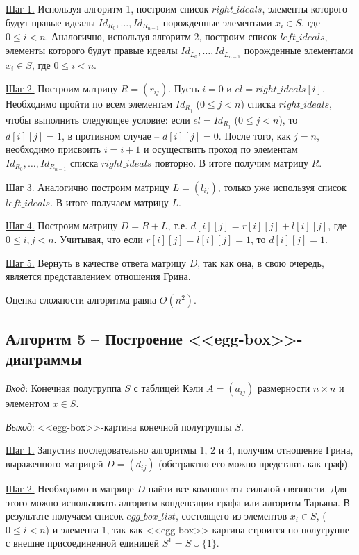 \documentclass[spec, och, labwork]{shiza}
\begin{document}
      \underline{Шаг 1.} Используя алгоритм 1, построим список $right\_ideals$, элементы которого будут правые идеалы $Id_{R_0}, \dots, Id_{R_{n-1}}$ порожденные
      элементами $x_i \in S$, где $0 \leq i < n$. Аналогично, используя алгоритм 2, построим список $left\_ideals$, элементы которого будут правые идеалы
      $Id_{L_0}, \dots, Id_{L_{n-1}}$ порожденные элементами $x_i \in S$, где $0 \leq i < n$.
      
      \underline{Шаг 2.}  Построим матрицу $R = (r_{ij})$. Пусть $i = 0$ и $el = right\_ideals[i]$. Необходимо пройти по всем элементам $Id_{R_j}$ ($0 \leq j < n$)
      списка $right\_ideals$, чтобы выполнить следующее условие: если $el = Id_{R_j}$ ($0 \leq j < n$), то $d[i][j] = 1$, в противном случае -- $d[i][j] = 0$.
      После того, как $j = n$, необходимо присвоить $i = i + 1$ и осуществить проход по элементам $Id_{R_0}, \dots, Id_{R_{n-1}}$ списка $right\_ideals$ повторно.
      В итоге получим матрицу $R$.
      
      \underline{Шаг 3.} Аналогично построим матрицу $L = (l_{ij})$, только уже используя список $left\_ideals$. В итоге получаем матрицу $L$.
  
      \underline{Шаг 4.} Построим матрицу $D = R + L$, т.е. $d[i][j] = r[i][j] + l[i][j]$, где $0 \leq i, j < n$. Учитывая, что если $r[i][j] = l[i][j] = 1$,
      то $d[i][j] = 1$.
  
      \underline{Шаг 5.} Вернуть в качестве ответа матрицу $D$, так как она, в свою очередь, является представлением отношения Грина.
      
        Оценка сложности алгоритма равна $O(n^2)$.
  
  
      \subsection{Алгоритм 5 -- Построение <<egg-box>>-диаграммы}
  
        \textit{Вход}: Конечная полугруппа $S$ с таблицей Кэли $A = (a_{ij})$ размерности $n \times n$ и элементом $x \in S$.
  
        \textit{Выход}: <<egg-box>>-картина конечной полугруппы $S$.
        
        \underline{Шаг 1.} Запустив последовательно алгоритмы 1, 2 и 4, получим отношение Грина, выраженного матрицей $D = (d_{ij})$ (обстрактно его можно представть как граф).
  
        \underline{Шаг 2.} Необходимо в матрице $D$ найти все компоненты сильной связности. Для этого можно использовать алгоритм конденсации графа или алгоритм Тарьяна. В результате получаем
        список $egg\_box\_list$, состоящего из элементов $x_i \in S$, ($0 \leq i < n$) и элемента 1, так как <<egg-box>>-картина строится по полугруппе
        с внешне присоединенной единицей $S^1 = S \cup \{1\}$.
  
\end{document}
